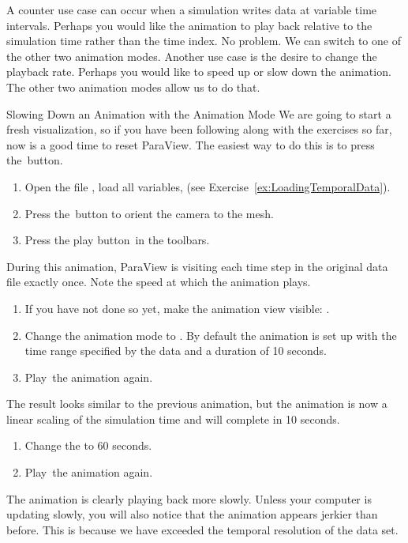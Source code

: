 A counter use case can occur when a simulation writes data at variable time
intervals.  Perhaps you would like the animation to play back relative to
the simulation time rather than the time index.  No problem.  We can switch
to one of the other two animation modes.  Another use case is the desire to
change the playback rate.  Perhaps you would like to speed up or slow down
the animation.  The other two animation modes allow us to do that.

\begin{exercise}{Slowing Down an Animation with the Animation Mode}%
  \label{ex:SlowingDownAnAnimation}%
  We are going to start a fresh visualization, so if you have been
  following along with the exercises so far, now is a good time to reset
  ParaView.  The easiest way to do this is to press the~\disconnect button.

  \begin{enumerate}
  \item Open the file , load all variables, \apply (see
    Exercise~\ref{ex:LoadingTemporalData}).
  \item Press the~\yPlus button to orient the camera to the mesh.
  \item Press the play button~\vcrPlay in the toolbars.
    \savecounter
  \end{enumerate}

  During this animation, ParaView is visiting each time step in the
  original data file exactly once.  Note the speed at which the animation
  plays.

  \begin{enumerate}
    \restorecounter
  \item If you have not done so yet, make the animation view visible:
     \ra {}.
  \item Change the animation mode to .  By default the
    animation is set up with the time range specified by the data and a
    duration of 10 seconds.
  \item Play~\vcrPlay the animation again.
    \savecounter
  \end{enumerate}

  The result looks similar to the previous 
  animation, but the animation is now a linear scaling of the simulation
  time and will complete in 10 seconds.

  \begin{enumerate}
    \restorecounter
  \item Change the  to 60 seconds.
  \item Play~\vcrPlay the animation again.
  \end{enumerate}

  The animation is clearly playing back more slowly.  Unless your computer
  is updating slowly, you will also notice that the animation appears
  jerkier than before.  This is because we have exceeded the temporal
  resolution of the data set.
\end{exercise}

